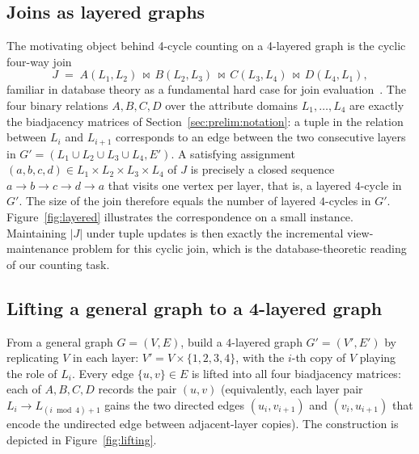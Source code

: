 \documentclass[sigconf,nonacm]{acmart}
\theoremstyle{plain}
\theoremstyle{definition}
\begin{document}
\subsection{Joins as layered graphs}
\label{sec:reduction:joins}
The motivating object behind 4-cycle counting on a 4-layered graph
is the cyclic four-way join
\[
  J \;=\; A(L_1, L_2) \,\bowtie\, B(L_2, L_3) \,\bowtie\, C(L_3, L_4) \,\bowtie\, D(L_4, L_1),
\]
familiar in database theory as a fundamental hard
case for join evaluation~\cite{NRR14,NPRR18}.
The four binary relations $A, B, C, D$ over the attribute domains
$L_1, \dots, L_4$ are exactly the biadjacency matrices of
Section~\ref{sec:prelim:notation}: a tuple in the relation between
$L_i$ and $L_{i+1}$ corresponds to an edge between the two
consecutive layers in $G' = (L_1 \cup L_2 \cup L_3 \cup L_4, E')$.
A satisfying assignment $(a, b, c, d) \in L_1 \times L_2 \times L_3 \times L_4$
of $J$ is precisely a closed sequence $a \to b \to c \to d \to a$
that visits one vertex per layer, that is, a layered $4$-cycle in $G'$.
The size of the join therefore equals the number of layered
$4$-cycles in $G'$. Figure~\ref{fig:layered} illustrates the
correspondence on a small instance. Maintaining $|J|$ under tuple
updates is then exactly the incremental view-maintenance problem for
this cyclic join, which is the database-theoretic reading of our
counting task.

\subsection{Lifting a general graph to a 4-layered graph}
\label{sec:reduction:lifting}
From a general graph $G = (V, E)$, build a $4$-layered graph
$G' = (V', E')$ by replicating $V$ in each layer:
$V' = V \times \{1, 2, 3, 4\}$, with the $i$-th copy of $V$ playing the
role of $L_i$. Every edge $\{u, v\} \in E$ is lifted into all four
biadjacency matrices: each of $A, B, C, D$ records the pair $(u, v)$
(equivalently, each layer pair $L_i \to L_{(i \bmod 4)+1}$ gains the
two directed edges $(u_i, v_{i+1})$ and $(v_i, u_{i+1})$ that encode
the undirected edge between adjacent-layer copies). The construction
is depicted in Figure~\ref{fig:lifting}.
\end{document}
